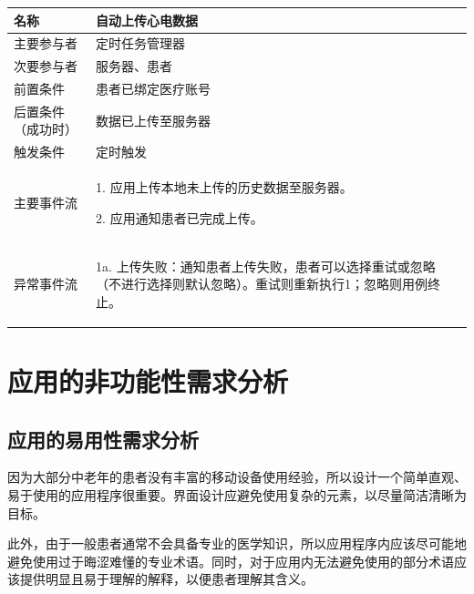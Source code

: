 \begin{table}[!ht]
    \label{tab:uc-upload}
    \begin{tabularx}{\textwidth}{|l|X|}
        \hline
        名称        & 自动上传心电数据  \\
        \hline
        主要参与者     & 定时任务管理器   \\
        \hline
        次要参与者     & 服务器、患者    \\
        \hline
        前置条件      & 患者已绑定医疗账号 \\
        \hline
        后置条件（成功时） & 数据已上传至服务器 \\
        \hline
        触发条件      & 定时触发      \\
        \hline
        主要事件流 &
        \begin{itemizec}
            \item[1.] 应用上传本地未上传的历史数据至服务器。
            \item[2.] 应用通知患者已完成上传。
        \end{itemizec} \\
        \hline
        异常事件流 &
        \begin{itemizec}
            \item[1a.] 上传失败：通知患者上传失败，患者可以选择重试或忽略（不进行选择则默认忽略）。重试则重新执行1；忽略则用例终止。
        \end{itemizec} \\
        \hline
    \end{tabularx}
\end{table}


\section{应用的非功能性需求分析}\label{sec:nonfunc-req}

\subsection{应用的易用性需求分析}\label{subsec:usability}

因为大部分中老年的患者没有丰富的移动设备使用经验，所以设计一个简单直观、易于使用的应用程序很重要。界面设计应避免使用复杂的元素，以尽量简洁清晰为目标。

此外，由于一般患者通常不会具备专业的医学知识，所以应用程序内应该尽可能地避免使用过于晦涩难懂的专业术语。同时，对于应用内无法避免使用的部分术语应该提供明显且易于理解的解释，以便患者理解其含义。

